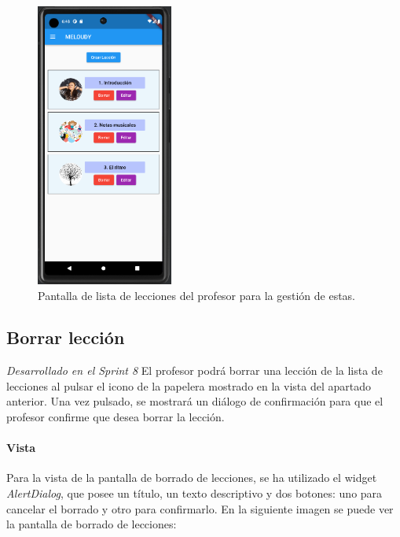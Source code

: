 \begin{figure}[H]
  \centering
  \includegraphics[width=0.4\textwidth]{imagenes/c7/listalecciones.png}
  \caption{Pantalla de lista de lecciones del profesor para la gestión de estas.} 
  \label{fig:login}
\end{figure}

\subsection{Borrar lección} 
\textit{Desarrollado en el Sprint 8}
El profesor podrá borrar una lección de la lista de lecciones al pulsar el icono de la papelera mostrado en la vista del apartado anterior. Una vez pulsado, se mostrará un diálogo de confirmación para que el profesor confirme que desea borrar la lección.

\paragraph*{Vista}
Para la vista de la pantalla de borrado de lecciones, se ha utilizado el widget \textit{AlertDialog}, que posee
un título, un texto descriptivo y dos botones: uno para cancelar el borrado y otro para confirmarlo.
En la siguiente imagen se puede ver la pantalla de borrado de lecciones:


